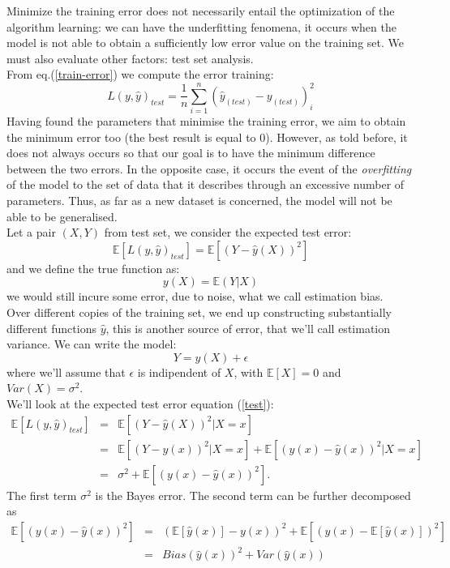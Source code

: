 \documentclass[a4paper,12pt]{report}
\begin{document}
Minimize the training error does not necessarily entail the optimization of the algorithm learning: we can have the underfitting fenomena, it occurs when the model is not able to obtain a sufficiently low error value on the training set.
We must also evaluate other factors: test set analysis.\\
From eq.(\ref{train-error}) we compute the error training:
\begin{equation}\label{test-error}
L(y,\hat{y})_{test}=\frac{1}{n}\sum_{i=1}^{n}(\hat{y}_{(test)}-y_{(test)})_{i}^2
\end{equation}
Having found the parameters that minimise the training error, we aim to obtain the minimum error too (the best result is equal to 0). However, as told before, it does not always occurs so that our goal is to have the minimum difference between the two errors.
In the opposite case, it occurs the event of the \textit{overfitting} of the model to the set of data that it describes through an excessive number of parameters. Thus, as far as a new dataset is concerned, the model will not be able to be generalised.\\
Let a pair $(X,Y)$ from test set, we consider the expected test error:
\begin{equation}\label{test}
\mathbb{E} [L(y,\hat{y})_{test}]=\mathbb{E} [(Y-\hat{y}(X))^{2}]
\end{equation}
and we define the true function as:
$$y(X)=\mathbb{E}(Y|X)$$
we would still incure some error, due to noise, what we call estimation bias.\\
Over different copies of the training set, we end up constructing substantially different functions $\hat{y}$, this is another source of error, that we'll call estimation variance. We can write the model:
$$Y=y(X)+\epsilon$$ where we'll assume that $\epsilon$ is indipendent of $X$, with $\mathbb{E}[X]=0$ and $Var(X)=\sigma^{2}$.\\
We'll look at the expected test error equation (\ref{test}):
\begin{eqnarray}
\mathbb{E} [L(y,\hat{y})_{test}] &=&\mathbb{E} [(Y-\hat{y}(X))^{2}|X=x]\nonumber\\
&=&\mathbb{E}[(Y-y(x))^2 |X=x]+\mathbb{E}[(y(x)-\hat{y}(x))^{2}|X=x]\nonumber\\
&=&\sigma^{2}+\mathbb{E}[(y(x)-\hat{y}(x))^{2}].
\end{eqnarray}
The first term $\sigma^{2}$ is the Bayes error. The second term can be further decomposed as
\begin{eqnarray}
\mathbb{E}[(y(x)-\hat{y}(x))^{2}]&=&(\mathbb{E}[\hat{y}(x)]-y(x))^{2}+\mathbb{E}[(\hat{y}(x)-\mathbb{E}[\hat{y}(x)])^{2}]\nonumber\\
&=&Bias(\hat{y}(x))^{2}+Var(\hat{y}(x))
\end{eqnarray}
\end{document}
